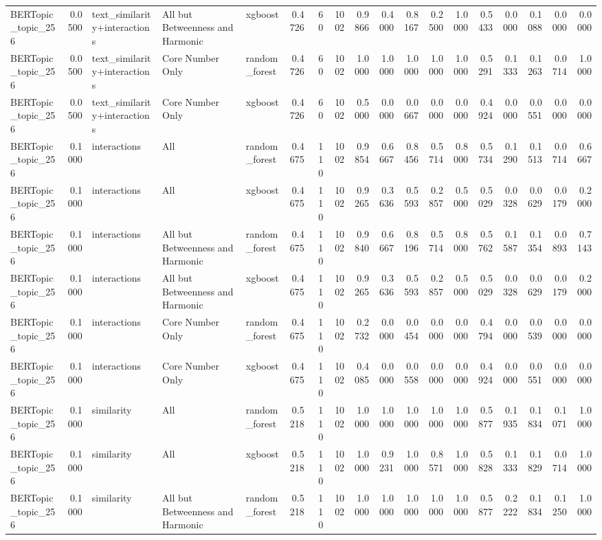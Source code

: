 \begin{tabular}{lrlllrrrrrrrrrrrrr}
BERTopic_topic_256 & 0.0500 & text_similarity+interactions & All but Betweenness and Harmonic & xgboost & 0.4726 & 60 & 1002 & 0.9866 & 0.4000 & 0.8167 & 0.2500 & 1.0000 & 0.5433 & 0.0000 & 0.1088 & 0.0000 & 0.0000 \\
BERTopic_topic_256 & 0.0500 & text_similarity+interactions & Core Number Only & random_forest & 0.4726 & 60 & 1002 & 1.0000 & 1.0000 & 1.0000 & 1.0000 & 1.0000 & 0.5291 & 0.1333 & 0.1263 & 0.0714 & 1.0000 \\
BERTopic_topic_256 & 0.0500 & text_similarity+interactions & Core Number Only & xgboost & 0.4726 & 60 & 1002 & 0.5000 & 0.0000 & 0.0667 & 0.0000 & 0.0000 & 0.4924 & 0.0000 & 0.0551 & 0.0000 & 0.0000 \\
BERTopic_topic_256 & 0.1000 & interactions & All & random_forest & 0.4675 & 110 & 1002 & 0.9854 & 0.6667 & 0.8456 & 0.5714 & 0.8000 & 0.5734 & 0.1290 & 0.1513 & 0.0714 & 0.6667 \\
BERTopic_topic_256 & 0.1000 & interactions & All & xgboost & 0.4675 & 110 & 1002 & 0.9265 & 0.3636 & 0.5593 & 0.2857 & 0.5000 & 0.5029 & 0.0328 & 0.0629 & 0.0179 & 0.2000 \\
BERTopic_topic_256 & 0.1000 & interactions & All but Betweenness and Harmonic & random_forest & 0.4675 & 110 & 1002 & 0.9840 & 0.6667 & 0.8196 & 0.5714 & 0.8000 & 0.5762 & 0.1587 & 0.1354 & 0.0893 & 0.7143 \\
BERTopic_topic_256 & 0.1000 & interactions & All but Betweenness and Harmonic & xgboost & 0.4675 & 110 & 1002 & 0.9265 & 0.3636 & 0.5593 & 0.2857 & 0.5000 & 0.5029 & 0.0328 & 0.0629 & 0.0179 & 0.2000 \\
BERTopic_topic_256 & 0.1000 & interactions & Core Number Only & random_forest & 0.4675 & 110 & 1002 & 0.2732 & 0.0000 & 0.0454 & 0.0000 & 0.0000 & 0.4794 & 0.0000 & 0.0539 & 0.0000 & 0.0000 \\
BERTopic_topic_256 & 0.1000 & interactions & Core Number Only & xgboost & 0.4675 & 110 & 1002 & 0.4085 & 0.0000 & 0.0558 & 0.0000 & 0.0000 & 0.4924 & 0.0000 & 0.0551 & 0.0000 & 0.0000 \\
BERTopic_topic_256 & 0.1000 & similarity & All & random_forest & 0.5218 & 110 & 1002 & 1.0000 & 1.0000 & 1.0000 & 1.0000 & 1.0000 & 0.5877 & 0.1935 & 0.1834 & 0.1071 & 1.0000 \\
BERTopic_topic_256 & 0.1000 & similarity & All & xgboost & 0.5218 & 110 & 1002 & 1.0000 & 0.9231 & 1.0000 & 0.8571 & 1.0000 & 0.5828 & 0.1333 & 0.1829 & 0.0714 & 1.0000 \\
BERTopic_topic_256 & 0.1000 & similarity & All but Betweenness and Harmonic & random_forest & 0.5218 & 110 & 1002 & 1.0000 & 1.0000 & 1.0000 & 1.0000 & 1.0000 & 0.5877 & 0.2222 & 0.1834 & 0.1250 & 1.0000 \\

\end{tabular}
